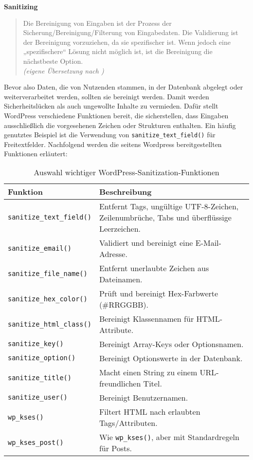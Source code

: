 \textbf{Sanitizing}
\begin{quote}
 Die Bereinigung von Eingaben ist der Prozess der Sicherung/Bereinigung/Filterung von Eingabedaten.
 Die Validierung ist der Bereinigung vorzuziehen, da sie spezifischer ist.
 Wenn jedoch eine „spezifischere“ Lösung nicht möglich ist, ist die Bereinigung die nächstbeste Option.
 \\[0.5em]
 \emph{(eigene Übersetzung nach \cite{wordpress2024plugin_sanitizing})}
\end{quote}


Bevor also Daten, die von Nutzenden stammen, in der Datenbank abgelegt oder weiterverarbeitet werden,
sollten sie bereinigt werden.
Damit werden Sicherheitslücken als auch ungewollte Inhalte zu vermieden.
Dafür stellt WordPress verschiedene Funktionen bereit, die sicherstellen, dass Eingaben ausschließlich
die vorgesehenen Zeichen oder Strukturen enthalten.
Ein häufig genutztes Beispiel ist die Verwendung von \texttt{sanitize\_text\_field()} für Freitextfelder.
Nachfolgend werden die seitens Wordpress bereitgestellten Funktionen erläutert:

\begin{table}[h]
 \centering
 \begin{tabular}{|l|p{8cm}|}
  \hline
  \textbf{Funktion} & \textbf{Beschreibung} \\
  \hline
  \texttt{sanitize\_text\_field()} & Entfernt Tags, ungültige UTF-8-Zeichen, \newline Zeilenumbrüche, Tabs und überflüssige Leerzeichen. \\
  \hline
  \texttt{sanitize\_email()} & Validiert und bereinigt eine E-Mail-Adresse. \\
  \hline
  \texttt{sanitize\_file\_name()} & Entfernt unerlaubte Zeichen aus Dateinamen. \\
  \hline
  \texttt{sanitize\_hex\_color()} & Prüft und bereinigt Hex-Farbwerte (\#RRGGBB). \\
  \hline
  \texttt{sanitize\_html\_class()} & Bereinigt Klassennamen für HTML-Attribute. \\
  \hline
  \texttt{sanitize\_key()} & Bereinigt Array-Keys oder Optionsnamen. \\
  \hline
  \texttt{sanitize\_option()} & Bereinigt Optionswerte in der Datenbank. \\
  \hline
  \texttt{sanitize\_title()} & Macht einen String zu einem URL-freundlichen Titel. \\
  \hline
  \texttt{sanitize\_user()} & Bereinigt Benutzernamen. \\
  \hline
  \texttt{wp\_kses()} & Filtert HTML nach erlaubten Tags/Attributen. \\
  \hline
  \texttt{wp\_kses\_post()} & Wie \texttt{wp\_kses()}, aber mit Standardregeln für Posts. \\
  \hline
 \end{tabular}
 \caption{Auswahl wichtiger WordPress-Sanitization-Funktionen}
\end{table}

